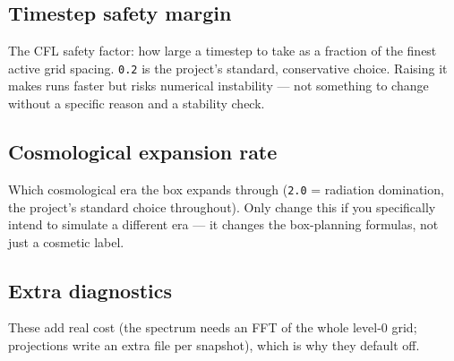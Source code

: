 \documentclass[11pt]{article}
\begin{document}
\subsection{Timestep safety margin}

\begin{description}[style=nextline,leftmargin=1.2em,itemsep=0.4em]
\item[\texttt{evolution.dt\_multiplier}]
  The CFL safety factor: how large a timestep to take as a fraction of the finest active grid spacing.
  \texttt{0.2} is the project's standard, conservative choice. Raising it makes runs faster but risks
  numerical instability --- not something to change without a specific reason and a stability check.
\end{description}

\subsection{Cosmological expansion rate}

\begin{description}[style=nextline,leftmargin=1.2em,itemsep=0.4em]
\item[\texttt{axion\_strings.a\_inv}]
  Which cosmological era the box expands through (\texttt{2.0} = radiation domination, the project's
  standard choice throughout). Only change this if you specifically intend to simulate a different era ---
  it changes the box-planning formulas, not just a cosmetic label.
\end{description}

\subsection{Extra diagnostics}

These add real cost (the spectrum needs an FFT of the whole level-0 grid; projections write an extra file
per snapshot), which is why they default off.
\end{document}
